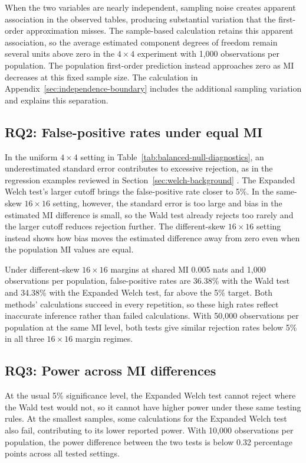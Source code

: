 When the two variables are nearly independent, sampling noise creates
apparent association in the observed tables, producing substantial variation
that the first-order approximation misses. The sample-based calculation
retains this apparent association, so the average estimated component
degrees of freedom remain several units above zero in the \(4\times4\)
experiment with 1,000 observations per population. The population
first-order prediction instead approaches zero as MI decreases at this
fixed sample size. The calculation in
Appendix~\ref{sec:independence-boundary} includes the additional sampling
variation and explains this separation.

\subsection{RQ2: False-positive rates under equal MI}

In the uniform \(4\times4\) setting in
Table~\ref{tab:balanced-null-diagnostics}, an underestimated standard error
contributes to excessive rejection, as in the regression examples reviewed
in Section~\ref{sec:welch-background} \citep{bell2002,kauermann2001}.
The Expanded Welch test's larger cutoff brings the false-positive rate closer to 5\%.
In the same-skew \(16\times16\) setting, however, the standard error is too
large and bias in the estimated MI difference is small, so the Wald test already
rejects too rarely and the larger cutoff reduces rejection further. The
different-skew \(16\times16\) setting instead shows how bias moves the
estimated difference away from zero even when the population MI values are
equal.

Under different-skew \(16\times16\) margins at shared MI 0.005 nats
and 1,000 observations per population, false-positive rates are 36.38\%
with the Wald test and 34.38\% with the Expanded Welch test, far above the 5\% target.
Both methods' calculations succeed in every repetition, so these high
rates reflect inaccurate inference rather than failed calculations. With
50,000 observations per population at the same MI level, both tests give
similar rejection rates below 5\% in all three \(16\times16\) margin
regimes.

\subsection{RQ3: Power across MI differences}

At the usual 5\% significance level, the Expanded Welch test cannot reject where
the Wald test would not, so it cannot have higher power under these same testing
rules. At the smallest samples, some calculations for the Expanded Welch test
also fail, contributing to its lower reported power. With 10,000 observations
per population, the power difference between the two tests is below
0.32 percentage points across all tested settings.

